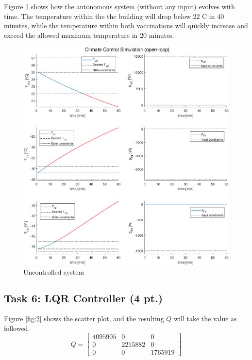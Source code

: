 \documentclass[a4paper,twoside,11pt]{article}
\numberwithin{equation}{section}
\begin{document}
Figure \ref{fig:1} shows how the autonomous system (without any input) evolves with time. The temperature within the the building will drop below 22 \textdegree C in 40 minutes, while the temperature within both vaccinations will quickly increase and exceed the allowed maximum temperature in 20 minutes. 

\begin{figure}[h]
\centering
\includegraphics[scale = 0.58]{image/5.eps}
\caption{Uncontrolled system}
\label{fig:1}
\end{figure}

\subsection{Task 6: LQR Controller (4 pt.)}

Figure \ref{fig:2} shows the scatter plot, and the resulting $Q$ will take the value as followed.
\begin{equation*}
    Q = 
    \begin{bmatrix}
    4095905 & 0 & 0 \\
    0 & 2215882 & 0 \\
    0 & 0 & 1765919
    \end{bmatrix}
\end{equation*}
\end{document}

